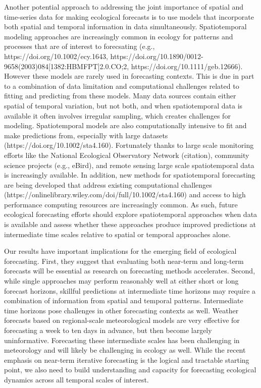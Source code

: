 \documentclass[11pt]{article}
\begin{document}
Another potential approach to addressing the joint importance of spatial and time-series data for making ecological forecasts is to use models that incorporate both spatial and temporal information in data simultaneously. Spatiotemporal modeling approaches are increasingly common in ecology for patterns and processes that are of interest to forecsating (e.g., https://doi.org/10.1002/ecy.1643, https://doi.org/10.1890/0012-9658(2003)084[1382:HBMFPT]2.0.CO;2, https://doi.org/10.1111/geb.12666). However these models are rarely used in forecasting contexts. This is due in part to a combination of data limitation and computational challenges related to fitting and predicting from these models. Many data sources contain either spatial of temporal variation, but not both, and when spatiotemporal data is available it often involves irregular sampling, which creates challenges for modeling. Spatiotemporal models are also computationally intensive to fit and make predictions from, especially with large datasets (https://doi.org/10.1002/sta4.160). Fortunately thanks to large scale monitoring efforts like the National Ecological Observatory Network (citation), community science projects (e.g., eBird), and remote sensing large scale spatiotemporal data is increasingly available. In addition, new methods for spatiotemporal forecasting are being developed that address existing computational challenges (https://onlinelibrary.wiley.com/doi/full/10.1002/sta4.160) and access to high performance computing resources are increasingly common. As such, future ecological forecasting efforts should explore spatiotemporal approaches when data is available and assess whether these approaches produce improved predictions at intermediate time scales relative to spatial or temporal approaches alone.

Our results have important implications for the emerging field of ecological forecasting. First, they suggest that evaluating both near-term and long-term
forecasts will be essential as research on forecasting methods accelerates. Second, while single approaches may perform reasonably well at either short or long forecast horizons, skillful predictions at intermediate time horizons may require a combination of information from spatial and temporal patterns. Intermediate time horizons pose challenges in other forecasting contexts as well. Weather forecasts based on regional-scale meteorological models are very effective for forecasting a week to ten days in advance, but then become largely uninformative. Forecasting these intermediate scales has been challenging in meteorology and will likely be challenging in ecology as well. While the recent emphasis on near-term iterative forecasting \citep{dietze_iterative_2018} is the logical and tractable starting point, we also need to build understanding and capacity for forecasting ecological dynamics across all temporal scales of interest.
\end{document}
